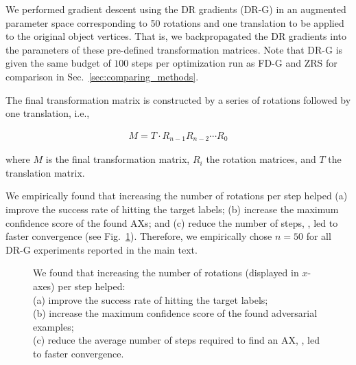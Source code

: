 \documentclass[10pt,twocolumn,letterpaper]{article}
\begin{document}
We performed gradient descent using the DR gradients (DR-G) in an augmented parameter space corresponding to 50 rotations and one translation to be applied to the original object vertices.
That is, we backpropagated the DR gradients into the parameters of these pre-defined transformation matrices.
Note that DR-G is given the same budget of $100$ steps per optimization run as FD-G and ZRS for comparison in Sec.~\ref{sec:comparing_methods}.

The final transformation matrix is constructed by a series of rotations followed
by one translation, i.e., 

\begin{align*}
M = T\cdot R_{n-1}R_{n-2}\cdots R_0
\end{align*}

\noindent where \(M\) is the final transformation matrix, \(R_i\) the rotation matrices, and \(T\) the translation matrix.  

We empirically found that increasing the number of rotations per step helped (a) improve the success rate of hitting the target labels; (b) increase the maximum confidence score of the found AXs; and (c) reduce the number of steps, \ie, led to faster convergence (see Fig.~\ref{fig:param-augm}).
Therefore, we empirically chose $n=50$ for all DR-G experiments reported in the main text.


\begin{figure}[h]
  \centering
	\caption{
  	We found that increasing the number of rotations (displayed in $x$-axes) per step helped:\\
  	(a) improve the success rate of hitting the target labels;\\
  	(b) increase the maximum confidence score of the found adversarial examples;\\
  	(c) reduce the average number of steps required to find an AX, \ie, led to faster convergence.\\
}
\label{fig:param-augm}
\end{figure}
\end{document}
